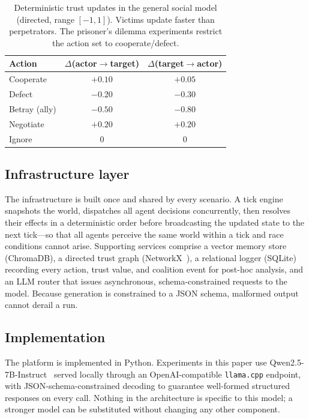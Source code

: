 \begin{table}[t]
  \caption{Deterministic trust updates in the general social model (directed, range $[-1,1]$). Victims update faster than perpetrators. The prisoner's dilemma experiments restrict the action set to cooperate/defect.}
  \label{tab:trust}
  \begin{tabular}{@{}lcc@{}}
    \toprule
    Action & $\Delta$(actor$\to$target) & $\Delta$(target$\to$actor) \\
    \midrule
    Cooperate & $+0.10$ & $+0.05$ \\
    Defect    & $-0.20$ & $-0.30$ \\
    Betray (ally) & $-0.50$ & $-0.80$ \\
    Negotiate & $+0.20$ & $+0.20$ \\
    Ignore    & $0$ & $0$ \\
    \bottomrule
  \end{tabular}
\end{table}

\subsection{Infrastructure layer}
The infrastructure is built once and shared by every scenario. A tick engine snapshots the world, dispatches all agent decisions concurrently, then resolves their effects in a deterministic order before broadcasting the updated state to the next tick---so that all agents perceive the same world within a tick and race conditions cannot arise. Supporting services comprise a vector memory store (ChromaDB), a directed trust graph (NetworkX~\cite{hagberg2008networkx}), a relational logger (SQLite) recording every action, trust value, and coalition event for post-hoc analysis, and an LLM router that issues asynchronous, schema-constrained requests to the model. Because generation is constrained to a JSON schema, malformed output cannot derail a run.

\subsection{Implementation}
The platform is implemented in Python. Experiments in this paper use Qwen2.5-7B-Instruct~\cite{qwen2024report} served locally through an OpenAI-compatible \texttt{llama.cpp} endpoint, with JSON-schema-constrained decoding to guarantee well-formed structured responses on every call. Nothing in the architecture is specific to this model; a stronger model can be substituted without changing any other component.

